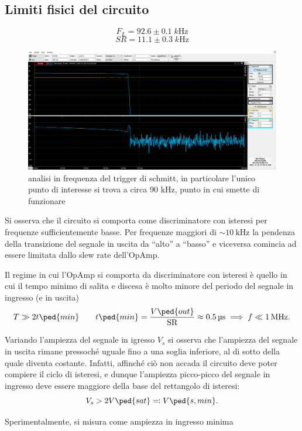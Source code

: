 \documentclass[10pt,a4paper]{article}
\begin{document}
\subsection{Limiti fisici del circuito}
\[
F_{L} = 92.6 \pm 0.1 \; \si{k\Hz}
\]
\[
SR = 11.1 \pm 0.3 \; \si{k\Hz}
\]
\begin{figure}[htbp]
\centering
\includegraphics[scale=0.4]{schmitt_freq}
\caption{analisi in frequenza del trigger di schmitt, in particolare l'unico punto di interesse si trova a circa 90 kHz, punto in cui smette di funzionare}
\end{figure}

Si osserva che il circuito si comporta come discriminatore con isteresi per
frequenze sufficientemente basse. Per frequenze maggiori di
$\sim\SI{10}{\kilo\hertz}$ la pendenza della transizione del segnale in
uscita da ``alto'' a ``basso'' e viceversa comincia ad essere limitata dallo
slew rate dell'OpAmp.

Il regime in cui l'OpAmp si comporta da discriminatore con isteresi è quello
in cui il tempo minimo di salita e discesa è molto minore del periodo del
segnale in ingresso (e in uscita)
\begin{equation}\label{eq:slewlimit}
T \gg 2 t \ped{min} \qquad t \ped{min} = \frac{V\ped{out}}{\mathrm{SR}} \approx \SI{0.5}{\micro\second} \implies f \ll \SI{1}{M\hertz}.
  \end{equation}

Variando l'ampiezza del segnale in igresso $V_s$ si osserva che l'ampiezza del
segnale in uscita rimane pressoché uguale fino a una soglia inferiore, al di
sotto della quale diventa costante. 
Infatti, affinché ciò non accada il circuito deve poter compiere il ciclo di
isteresi, e dunque l'ampiezza picco-picco del segnale in ingresso deve essere
maggiore della base del rettangolo di isteresi:
\[ V_s > 2 V \ped{sat} \eqqcolon V\ped{s, min}. \]

Sperimentalmente, si misura come ampiezza in ingresso minima
\end{document}
